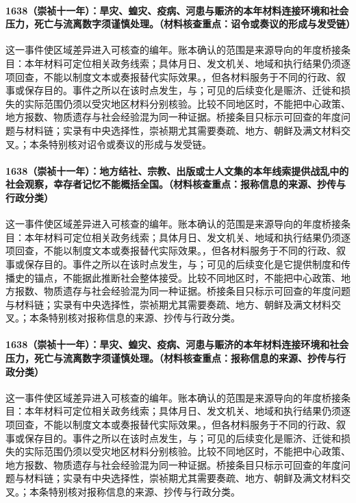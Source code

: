 \paragraph{1638（崇祯十一年）：旱灾、蝗灾、疫病、河患与赈济的本年材料连接环境和社会压力，死亡与流离数字须谨慎处理。（材料核查重点：诏令或奏议的形成与发受链）} 这一事件使区域差异进入可核查的编年。账本确认的范围是来源导向的年度桥接条目：本年材料可定位相关政务线索；具体月日、发文机关、地域和执行结果仍须逐项回查，不能以制度文本或奏报替代实际效果。，但各材料服务于不同的行政、叙事或保存目的。事件之所以在该时点发生，与；可见的后续变化是赈济、迁徙和损失的实际范围仍须以受灾地区材料分别核验。比较不同地区时，不能把中心政策、地方报数、物质遗存与社会经验混为同一种证据。桥接条目只标示可回查的年度问题与材料链；实录有中央选择性，崇祯期尤其需要奏疏、地方、朝鲜及满文材料交叉。；本条特别核对诏令或奏议的形成与发受链。

\paragraph{1638（崇祯十一年）：地方结社、宗教、出版或士人文集的本年线索提供战乱中的社会观察，幸存者记忆不能概括全国。（材料核查重点：报称信息的来源、抄传与行政分类）} 这一事件使区域差异进入可核查的编年。账本确认的范围是来源导向的年度桥接条目：本年材料可定位相关政务线索；具体月日、发文机关、地域和执行结果仍须逐项回查，不能以制度文本或奏报替代实际效果。，但各材料服务于不同的行政、叙事或保存目的。事件之所以在该时点发生，与；可见的后续变化是它提供制度和传播史的锚点，不能据此推断社会整体接受。比较不同地区时，不能把中心政策、地方报数、物质遗存与社会经验混为同一种证据。桥接条目只标示可回查的年度问题与材料链；实录有中央选择性，崇祯期尤其需要奏疏、地方、朝鲜及满文材料交叉。；本条特别核对报称信息的来源、抄传与行政分类。

\paragraph{1638（崇祯十一年）：旱灾、蝗灾、疫病、河患与赈济的本年材料连接环境和社会压力，死亡与流离数字须谨慎处理。（材料核查重点：报称信息的来源、抄传与行政分类）} 这一事件使区域差异进入可核查的编年。账本确认的范围是来源导向的年度桥接条目：本年材料可定位相关政务线索；具体月日、发文机关、地域和执行结果仍须逐项回查，不能以制度文本或奏报替代实际效果。，但各材料服务于不同的行政、叙事或保存目的。事件之所以在该时点发生，与；可见的后续变化是赈济、迁徙和损失的实际范围仍须以受灾地区材料分别核验。比较不同地区时，不能把中心政策、地方报数、物质遗存与社会经验混为同一种证据。桥接条目只标示可回查的年度问题与材料链；实录有中央选择性，崇祯期尤其需要奏疏、地方、朝鲜及满文材料交叉。；本条特别核对报称信息的来源、抄传与行政分类。

